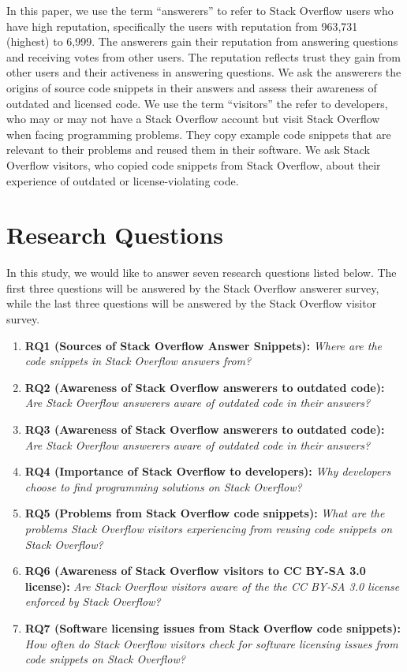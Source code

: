\documentclass{svjour3}                     %
\begin{document}
In this paper, we use the term ``answerers'' to refer to Stack Overflow users
who have high reputation, specifically the users with reputation from 963,731
(highest)  to 6,999. The answerers gain their reputation from answering
questions and receiving votes from other users. The reputation reflects trust
they gain from other users and their activeness in answering questions. We ask
the answerers the origins of source code snippets in their answers  and assess
their awareness of outdated and licensed code. 
We use the term ``visitors'' the
refer to developers, who may or may not have a Stack Overflow account but visit
Stack Overflow when facing programming problems. They copy example code snippets
that are relevant to their problems and reused them in their software. 
We ask Stack Overflow visitors, who copied code snippets from
Stack Overflow, about their experience of outdated or license-violating code.

\section{Research Questions}
In this study, we would like to answer seven research questions listed below. The first three questions will be
answered by the Stack Overflow answerer survey, while the last three questions will be answered by the
Stack Overflow visitor survey.

\begin{enumerate}
	\item \textbf{RQ1 (Sources of Stack Overflow Answer Snippets):} \textit{Where are the code snippets in Stack Overflow answers from?}
	\item \textbf{RQ2 (Awareness of Stack Overflow answerers to outdated code):} \textit{Are Stack Overflow answerers aware of outdated code in their answers?}
	\item \textbf{RQ3 (Awareness of Stack Overflow answerers to outdated code):} \textit{Are Stack Overflow answerers aware of outdated code in their answers?}
	\item \textbf{RQ4 (Importance of Stack Overflow to developers):} \textit{Why developers choose to find programming solutions on Stack Overflow?}
	\item \textbf{RQ5 (Problems from Stack Overflow code snippets):} \textit{What are the problems Stack Overflow visitors experiencing from reusing code snippets on Stack Overflow?}
	\item \textbf{RQ6 (Awareness of Stack Overflow visitors to CC BY-SA 3.0 license):} \textit{Are Stack Overflow visitors aware of the the CC BY-SA 3.0 license enforced by Stack Overflow?}
	\item \textbf{RQ7 (Software licensing issues from Stack Overflow code snippets):} \textit{How often do Stack Overflow visitors check for software licensing issues from code snippets on Stack Overflow?}
\end{enumerate}
\end{document}
